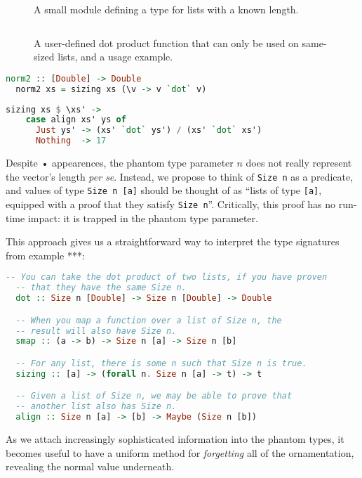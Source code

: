 \documentclass[format=sigplan, review=false, screen=true]{acmart}
\begin{document}
\begin{figure}
    \inputminted{haskell}{ex1.hs}
  \caption{A small module defining a type for lists with a known length.}
\end{figure}
\begin{figure}
    \inputminted{haskell}{ex2.hs}
    \caption{A user-defined dot product function that can only be used on same-sized lists,
    and a usage example.}
\end{figure}


\begin{lstlisting}[language=Haskell]
  norm2 :: [Double] -> Double
  norm2 xs = sizing xs (\v -> v `dot` v)
\end{lstlisting}

\begin{lstlisting}[language=Haskell]
  sizing xs $ \xs' -> 
    case align xs' ys of
      Just ys' -> (xs' `dot` ys') / (xs' `dot` xs')
      Nothing  -> 17
\end{lstlisting}

Despite  • appearences, the phantom type parameter $n$ does not really represent the vector's length
{\em per se}. Instead, we propose to think of \texttt{Size n} as a predicate, and values of
type \texttt{Size n [a]} should be thought of as ``lists of type \texttt{[a]}, equipped with a proof
that they satisfy \texttt{Size n}''. Critically, this proof has no run-time impact: it is trapped in
the phantom type parameter.

This approach gives us a straightforward way to interpret the type signatures from example ***:

\begin{lstlisting}[language=Haskell]
  -- You can take the dot product of two lists, if you have proven
  -- that they have the same Size n.
  dot :: Size n [Double] -> Size n [Double] -> Double

  -- When you map a function over a list of Size n, the
  -- result will also have Size n.
  smap :: (a -> b) -> Size n [a] -> Size n [b]

  -- For any list, there is some n such that Size n is true.
  sizing :: [a] -> (forall n. Size n [a] -> t) -> t

  -- Given a list of Size n, we may be able to prove that
  -- another list also has Size n.
  align :: Size n [a] -> [b] -> Maybe (Size n [b])
\end{lstlisting}

As we attach increasingly sophisticated information into the phantom types, it becomes useful to
have a uniform method for \emph{forgetting} all of the ornamentation, revealing the normal
value underneath.
\end{document}
